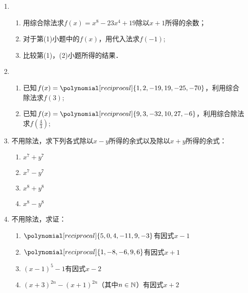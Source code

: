 \begin{enumerate}
\item \begin{enumerate}[(1)]
    \item 用综合除法求$f(x)=x^8-23x^4+19$除以$x+1$所得的余数；
\item 对于第(1)小题中的$f(x)$，用代入法求$f(-1)$;
\item 比较第(1)，(2)小题所得的结果．
\end{enumerate}

\item \begin{enumerate}[(1)]
    \item 已知$f(x)=\polynomial[reciprocal]{1,2,-19,19,-25,-70}$，利用综合除法求$f(3)$;
    \item 已知$f(x)=\polynomial[reciprocal]{9,3,-32,10,27,-6}$，利用综合除法求$f\left(\frac{4}{3}\right)$;
\end{enumerate}

\item 不用除法，求下列各式除以$x-y$所得的余式以及除以$x+y$所得的余式：
\begin{multicols}{2}
\begin{enumerate}[(1)]
    \item $x^7+y^7$
    \item $x^7-y^7$
    \item $x^8+y^8$
    \item $x^8-y^8$
\end{enumerate}
\end{multicols}
\item 不用除法，求证：
\begin{enumerate}[(1)]
    \item $\polynomial[reciprocal]{5,0,4,-11,9,-3}$有因式$x-1$
    \item $\polynomial[reciprocal]{1,-8,-6,9,6}$有因式$x+1$
    \item $(x-1)^5-1$有因式$x-2$
    \item $(x+3)^{2n}-(x+1)^{2n}$（其中$n\in\mathbb{N}$）有因式$x+2$
\end{enumerate}


\end{enumerate}

